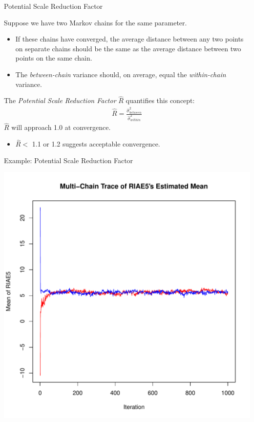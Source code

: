 \documentclass{beamer}\usepackage[]{graphicx}\usepackage[]{color}
\newenvironment{knitrout}{}{} %
\begin{document}
\begin{frame}{Potential Scale Reduction Factor}
  
  Suppose we have two Markov chains for the same parameter.
  \vc 
  \begin{itemize}
  \item If these chains have converged, the average distance between any two
    points on separate chains should be the same as the average distance 
    between two points on the same chain.
    \vc
  \item The \emph{between-chain} variance should, on average, equal the 
    \emph{within-chain} variance.
  \end{itemize}
  \vc
  The \emph{Potential Scale Reduction Factor} $\widehat{R}$ quantifies this 
  concept:
  \begin{align*}
    \widehat{R} = \frac{\hat{\sigma}^2_{between}}{\hat{\sigma}^2_{within}}
  \end{align*}
  $\widehat{R}$ will approach 1.0 at convergence.
  \vc
  \begin{itemize}
  \item $\widehat{R} < $ 1.1 or 1.2 suggests acceptable convergence.
  \end{itemize}
  
\end{frame}

\watermarkoff %

\begin{frame}{Example: Potential Scale Reduction Factor}
   
\begin{knitrout}\footnotesize
{}\color{fgcolor}

{\centering \includegraphics[width=0.65\linewidth]{figure/unnamed-chunk-3-1} 

}



\end{knitrout}

\end{frame}
\end{document}
